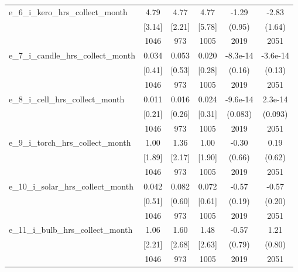 \begin{table}[htbp]
\begin{tabular*}{0.9\hsize}{@{\hskip\tabcolsep\extracolsep\fill}l*{1}{ccccc}}
e\_6\_i\_kero\_hrs\_collect\_month    &     4.79&     4.77&     4.77&    -1.29         &    -2.83\sym{*}  \\
                                &   [3.14]&   [2.21]&   [5.78]&   (0.95)         &   (1.64)         \\
                                &     1046&      973&     1005&     2019         &     2051         \\
e\_7\_i\_candle\_hrs\_collect\_month  &    0.034&    0.053&    0.020& -8.3e-14         & -3.6e-14         \\
                                &   [0.41]&   [0.53]&   [0.28]&   (0.16)         &   (0.13)         \\
                                &     1046&      973&     1005&     2019         &     2051         \\
e\_8\_i\_cell\_hrs\_collect\_month    &    0.011&    0.016&    0.024& -9.6e-14         &  2.3e-14         \\
                                &   [0.21]&   [0.26]&   [0.31]&  (0.083)         &  (0.093)         \\
                                &     1046&      973&     1005&     2019         &     2051         \\
e\_9\_i\_torch\_hrs\_collect\_month   &     1.00&     1.36&     1.00&    -0.30         &     0.19         \\
                                &   [1.89]&   [2.17]&   [1.90]&   (0.66)         &   (0.62)         \\
                                &     1046&      973&     1005&     2019         &     2051         \\
e\_10\_i\_solar\_hrs\_collect\_month  &    0.042&    0.082&    0.072&    -0.57\sym{***}&    -0.57\sym{***}\\
                                &   [0.51]&   [0.60]&   [0.61]&   (0.19)         &   (0.20)         \\
                                &     1046&      973&     1005&     2019         &     2051         \\
e\_11\_i\_bulb\_hrs\_collect\_month   &     1.06&     1.60&     1.48&    -0.57         &     1.21         \\
                                &   [2.21]&   [2.68]&   [2.63]&   (0.79)         &   (0.80)         \\
                                &     1046&      973&     1005&     2019         &     2051         \\

\end{tabular*}
\end{table}
